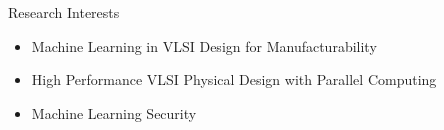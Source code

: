 
\begin{rSection}{Research Interests}
\begin{itemize}
 \item Machine Learning in VLSI Design for Manufacturability
 \item High Performance VLSI Physical Design with Parallel Computing
  \item Machine Learning Security
\end{itemize}
\end{rSection}



